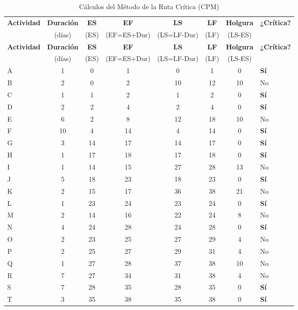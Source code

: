 \documentclass[a4paper,9pt]{article}
\begin{document}
\begin{longtable}{@{}lccccccl@{}}
\caption{Cálculos del Método de la Ruta Crítica (CPM)}
\label{tab:resultados_cpm} \\
\toprule
\textbf{Actividad} & \textbf{Duración} & \textbf{ES} & \textbf{EF} & \textbf{LS} & \textbf{LF} & \textbf{Holgura} & \textbf{¿Crítica?} \\
 & (días) & (ES) & (EF=ES+Dur) & (LS=LF-Dur) & (LF) & (LS-ES) & \\
\midrule
\endfirsthead
\toprule
\textbf{Actividad} & \textbf{Duración} & \textbf{ES} & \textbf{EF} & \textbf{LS} & \textbf{LF} & \textbf{Holgura} & \textbf{¿Crítica?} \\
 & (días) & (ES) & (EF=ES+Dur) & (LS=LF-Dur) & (LF) & (LS-ES) & \\
\midrule
\endhead
A & 1 & 0 & 1 & 0 & 1 & 0 & \textbf{Sí} \\
B & 2 & 0 & 2 & 10 & 12 & 10 & No \\
C & 1 & 1 & 2 & 1 & 2 & 0 & \textbf{Sí} \\
D & 2 & 2 & 4 & 2 & 4 & 0 & \textbf{Sí} \\
E & 6 & 2 & 8 & 12 & 18 & 10 & No \\
F & 10 & 4 & 14 & 4 & 14 & 0 & \textbf{Sí} \\
G & 3 & 14 & 17 & 14 & 17 & 0 & \textbf{Sí} \\
H & 1 & 17 & 18 & 17 & 18 & 0 & \textbf{Sí} \\
I & 1 & 14 & 15 & 27 & 28 & 13 & No \\
J & 5 & 18 & 23 & 18 & 23 & 0 & \textbf{Sí} \\
K & 2 & 15 & 17 & 36 & 38 & 21 & No \\
L & 1 & 23 & 24 & 23 & 24 & 0 & \textbf{Sí} \\
M & 2 & 14 & 16 & 22 & 24 & 8 & No \\
N & 4 & 24 & 28 & 24 & 28 & 0 & \textbf{Sí} \\
O & 2 & 23 & 25 & 27 & 29 & 4 & No \\
P & 2 & 25 & 27 & 29 & 31 & 4 & No \\
Q & 1 & 27 & 28 & 37 & 38 & 10 & No \\
R & 7 & 27 & 34 & 31 & 38 & 4 & No \\
S & 7 & 28 & 35 & 28 & 35 & 0 & \textbf{Sí} \\
T & 3 & 35 & 38 & 35 & 38 & 0 & \textbf{Sí} \\
\bottomrule
\end{longtable}


\end{document}
